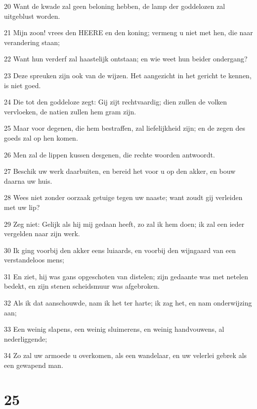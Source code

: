 \par 20 Want de kwade zal geen beloning hebben, de lamp der goddelozen zal uitgeblust worden.
\par 21 Mijn zoon! vrees den HEERE en den koning; vermeng u niet met hen, die naar verandering staan;
\par 22 Want hun verderf zal haastelijk ontstaan; en wie weet hun beider ondergang?
\par 23 Deze spreuken zijn ook van de wijzen. Het aangezicht in het gericht te kennen, is niet goed.
\par 24 Die tot den goddeloze zegt: Gij zijt rechtvaardig; dien zullen de volken vervloeken, de natien zullen hem gram zijn.
\par 25 Maar voor degenen, die hem bestraffen, zal liefelijkheid zijn; en de zegen des goeds zal op hen komen.
\par 26 Men zal de lippen kussen desgenen, die rechte woorden antwoordt.
\par 27 Beschik uw werk daarbuiten, en bereid het voor u op den akker, en bouw daarna uw huis.
\par 28 Wees niet zonder oorzaak getuige tegen uw naaste; want zoudt gij verleiden met uw lip?
\par 29 Zeg niet: Gelijk als hij mij gedaan heeft, zo zal ik hem doen; ik zal een ieder vergelden naar zijn werk.
\par 30 Ik ging voorbij den akker eens luiaards, en voorbij den wijngaard van een verstandeloos mens;
\par 31 En ziet, hij was gans opgeschoten van distelen; zijn gedaante was met netelen bedekt, en zijn stenen scheidsmuur was afgebroken.
\par 32 Als ik dat aanschouwde, nam ik het ter harte; ik zag het, en nam onderwijzing aan;
\par 33 Een weinig slapens, een weinig sluimerens, en weinig handvouwens, al nederliggende;
\par 34 Zo zal uw armoede u overkomen, als een wandelaar, en uw velerlei gebrek als een gewapend man.

\chapter{25}

